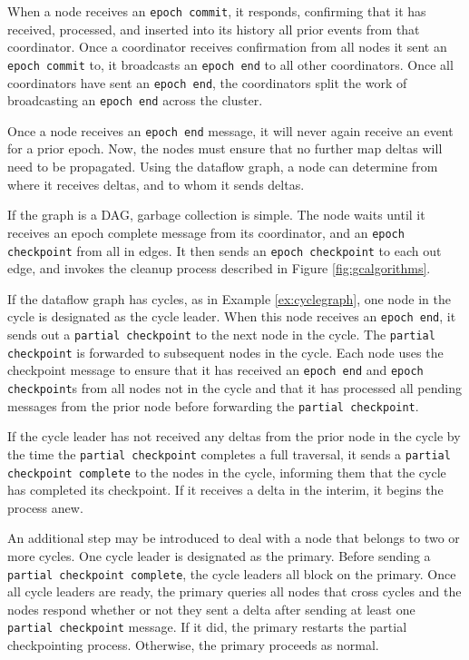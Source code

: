 \documentclass{vldb}
\begin{document}
When a node receives an \texttt{epoch commit}, it responds, confirming that it has received, processed, and inserted into its history all prior events from that coordinator.  Once a coordinator receives confirmation from all nodes it sent an \texttt{epoch commit} to, it broadcasts an \texttt{epoch end} to all other coordinators.  Once all coordinators have sent an \texttt{epoch end}, the coordinators split the work of broadcasting an \texttt{epoch end} across the cluster.

Once a node receives an \texttt{epoch end} message, it will never again receive an event for a prior epoch.  Now, the nodes must ensure that no further map deltas will need to be propagated.  Using the dataflow graph, a node can determine from where it receives deltas, and to whom it sends deltas.  

If the graph is a DAG, garbage collection is simple.  The node waits until it receives an epoch complete message from its coordinator, and an \texttt{epoch checkpoint} from all in edges.  It then sends an \texttt{epoch checkpoint} to each out edge, and invokes the cleanup process described in Figure \ref{fig:gcalgorithms}.

If the dataflow graph has cycles, as in Example \ref{ex:cyclegraph}, one node in the cycle is designated as the cycle leader.  When this node receives an \texttt{epoch end}, it sends out a \texttt{partial checkpoint} to the next node in the cycle.  The \texttt{partial checkpoint} is forwarded to subsequent nodes in the cycle.  Each node uses the checkpoint message to ensure that it has received an \texttt{epoch end} and \texttt{epoch checkpoint}s from all nodes not in the cycle and that it has processed all pending messages from the prior node before forwarding the \texttt{partial checkpoint}.  

If the cycle leader has not received any deltas from the prior node in the cycle by the time the \texttt{partial checkpoint} completes a full traversal, it sends a \texttt{partial checkpoint complete} to the nodes in the cycle, informing them that the cycle has completed its checkpoint. If it receives a delta in the interim, it begins the process anew.

An additional step may be introduced to deal with a node that belongs to two or more cycles.  One cycle leader is designated as the primary.  Before sending a \texttt{partial checkpoint complete}, the cycle leaders all block on the primary.  Once all cycle leaders are ready, the primary queries all nodes that cross cycles and the nodes respond whether or not they sent a delta after sending at least one \texttt{partial checkpoint} message.  If it did, the primary restarts the partial checkpointing process.  Otherwise, the primary proceeds as normal.
\end{document}

